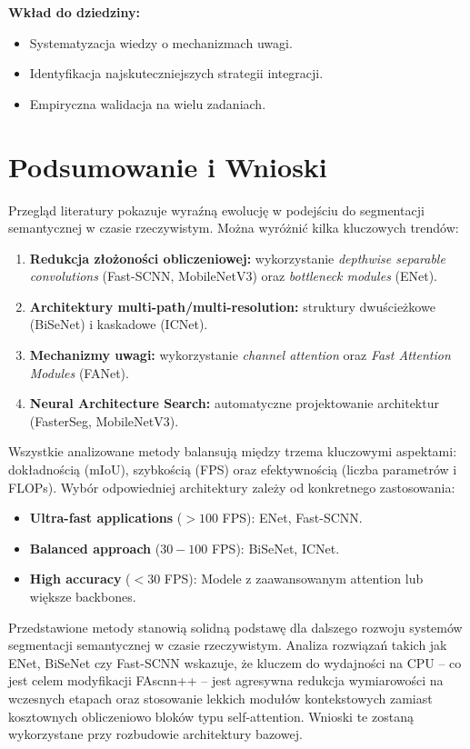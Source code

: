 \textbf{Wkład do dziedziny:}
\begin{itemize}
    \item Systematyzacja wiedzy o mechanizmach uwagi.
    \item Identyfikacja najskuteczniejszych strategii integracji.
    \item Empiryczna walidacja na wielu zadaniach.
\end{itemize}

\section{Podsumowanie i Wnioski}

Przegląd literatury pokazuje wyraźną ewolucję w podejściu do segmentacji semantycznej w czasie rzeczywistym. Można wyróżnić kilka kluczowych trendów:

\begin{enumerate}
    \item \textbf{Redukcja złożoności obliczeniowej:} wykorzystanie \textit{depthwise separable convolutions} (Fast-SCNN, MobileNetV3) oraz \textit{bottleneck modules} (ENet).
    \item \textbf{Architektury multi-path/multi-resolution:} struktury dwuścieżkowe (BiSeNet) i kaskadowe (ICNet).
    \item \textbf{Mechanizmy uwagi:} wykorzystanie \textit{channel attention} oraz \textit{Fast Attention Modules} (FANet).
    \item \textbf{Neural Architecture Search:} automatyczne projektowanie architektur (FasterSeg, MobileNetV3).
\end{enumerate}

Wszystkie analizowane metody balansują między trzema kluczowymi aspektami: dokładnością (mIoU), szybkością (FPS) oraz efektywnością (liczba parametrów i FLOPs). Wybór odpowiedniej architektury zależy od konkretnego zastosowania:
\begin{itemize}
    \item \textbf{Ultra-fast applications} ($>100$ FPS): ENet, Fast-SCNN.
    \item \textbf{Balanced approach} ($30-100$ FPS): BiSeNet, ICNet.
    \item \textbf{High accuracy} ($<30$ FPS): Modele z zaawansowanym attention lub większe backbones.
\end{itemize}

Przedstawione metody stanowią solidną podstawę dla dalszego rozwoju systemów segmentacji semantycznej w czasie rzeczywistym. Analiza rozwiązań takich jak ENet, BiSeNet czy Fast-SCNN wskazuje, że kluczem do wydajności na CPU -- co jest celem modyfikacji FAscnn++ -- jest agresywna redukcja wymiarowości na wczesnych etapach oraz stosowanie lekkich modułów kontekstowych zamiast kosztownych obliczeniowo bloków typu self-attention. Wnioski te zostaną wykorzystane przy rozbudowie architektury bazowej.

